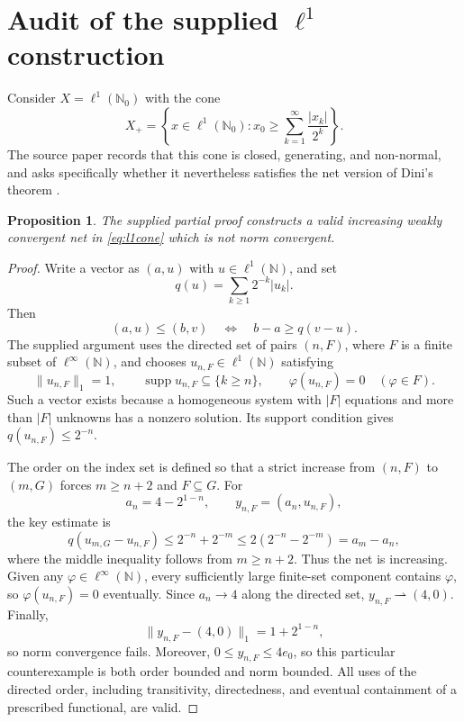 \documentclass[11pt]{article}
\newtheorem{proposition}[theorem]{Proposition}
\theoremstyle{remark}
\newcommand{\norm}[1]{\lVert #1\rVert}
\newcommand{\supp}{\operatorname{supp}}
\begin{document}
\section{Audit of the supplied \texorpdfstring{$\ell^1$}{l1} construction}

Consider $X=\ell^1(\mathbb N_0)$ with the cone
\begin{equation}\label{eq:l1cone}
 X_+
 =\left\{x\in\ell^1(\mathbb N_0):
 x_0\geq\sum_{k=1}^{\infty}\frac{|x_k|}{2^k}\right\}.
\end{equation}
The source paper records that this cone is closed, generating, and
non-normal, and asks specifically whether it nevertheless satisfies the
net version of Dini's theorem \cite[Example~6.1 and Open
Problem~6.2]{Glueck2025}.

\begin{proposition}\label{prop:audit}
The supplied partial proof constructs a valid increasing weakly convergent
net in \eqref{eq:l1cone} which is not norm convergent.
\end{proposition}

\begin{proof}
Write a vector as $(a,u)$ with $u\in\ell^1(\mathbb N)$, and set
\[
  q(u)=\sum_{k\geq1}2^{-k}|u_k|.
\]
Then
\[
 (a,u)\leq(b,v) \quad\Longleftrightarrow\quad b-a\geq q(v-u).
\]
The supplied argument uses the directed set of pairs $(n,F)$, where $F$ is
a finite subset of $\ell^\infty(\mathbb N)$, and chooses
$u_{n,F}\in\ell^1(\mathbb N)$ satisfying
\[
 \norm{u_{n,F}}_1=1,
 \qquad
 \supp u_{n,F}\subseteq\{k\geq n\},
 \qquad
 \varphi(u_{n,F})=0\quad(\varphi\in F).
\]
Such a vector exists because a homogeneous system with $|F|$ equations and
more than $|F|$ unknowns has a nonzero solution.  Its support condition
gives $q(u_{n,F})\leq2^{-n}$.

The order on the index set is defined so that a strict increase from
$(n,F)$ to $(m,G)$ forces $m\geq n+2$ and $F\subseteq G$.  For
\[
 a_n=4-2^{1-n},
 \qquad
 y_{n,F}=(a_n,u_{n,F}),
\]
the key estimate is
\[
 q(u_{m,G}-u_{n,F})
 \leq 2^{-n}+2^{-m}
 \leq 2(2^{-n}-2^{-m})
 =a_m-a_n,
\]
where the middle inequality follows from $m\geq n+2$.  Thus the net is
increasing.  Given any $\varphi\in\ell^\infty(\mathbb N)$, every sufficiently
large finite-set component contains $\varphi$, so
$\varphi(u_{n,F})=0$ eventually.  Since $a_n\to4$ along the directed set,
$y_{n,F}\rightharpoonup(4,0)$.  Finally,
\[
 \norm{y_{n,F}-(4,0)}_1=1+2^{1-n},
\]
so norm convergence fails.  Moreover, $0\leq y_{n,F}\leq4e_0$, so this
particular counterexample is both order bounded and norm bounded.  All uses
of the directed order, including transitivity, directedness, and eventual
containment of a prescribed functional, are valid.
\end{proof}
\end{document}
